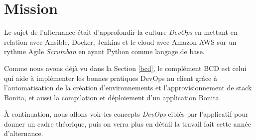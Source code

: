 \section{Mission}
Le sujet de l'alternance était d'approfondir la culture \emph{DevOps} en mettant en relation avec Ansible, Docker, Jenkins et le cloud avec Amazon AWS sur un rythme Agile \textit{Scrumban} en ayant Python comme langage de base.

Comme nous avons déjà vu dans la Section \ref{bcd}, le complément BCD est celui qui aide à implémenter les bonnes pratiques DevOps au client grâce à l'automatisation de la création d'environnements et l'approvisionnement de stack Bonita, et aussi la compilation et déploiement d'un application Bonita.

À continuation, nous allons voir les concepts \emph{DevOps} ciblés par l'applicatif pour donner un cadre théorique, puis on verra plus en détail la travail fait cette année d'alternance.












